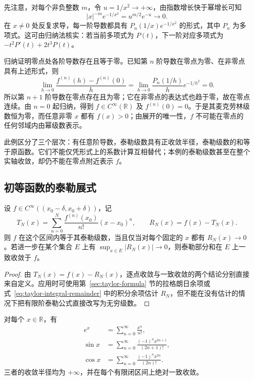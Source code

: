 \begin{solve}
先注意，对每个非负整数 $m$，令 $u=1/x^2\to+\infty$，由指数增长快于幂增长可知
\[
    |x|^{-m}e^{-1/x^2}=u^{m/2}e^{-u}\longrightarrow0.
\]
在 $x\neq0$ 处反复求导，每一阶导数都具有 $P_n(1/x)e^{-1/x^2}$ 的形式，其中 $P_n$ 为多项式。这可由归纳法核实：若当前多项式为 $P(t)$，下一阶对应多项式为 $-t^2P'(t)+2t^3P(t)$。

归纳证明零点处各阶导数存在且等于零。已知第 $n$ 阶导数在零点为零、在非零点具有上述形式，则
\[
    \lim_{h\to0}\frac{f^{(n)}(h)-f^{(n)}(0)}h
       =\lim_{h\to0}\frac{P_n(1/h)}h e^{-1/h^2}=0.
\]
所以第 $n+1$ 阶导数在零点存在且为零；它在非零点的表达式也趋于零，故在零点连续。由 $n=0$ 起归纳，得到 $f\in C^\infty(\mathbb R)$ 及 $f^{(n)}(0)=0$。于是其麦克劳林级数恒为零，而任意非零 $x$ 都有 $f(x)>0$；由展开的唯一性，$f$ 不可能在零点的任何邻域内由幂级数表示。
\end{solve}

此例区分了三个层次：有任意阶导数，泰勒级数具有正收敛半径，泰勒级数的和等于原函数。它们不能仅凭形式上的系数计算互相替代；本例的泰勒级数甚至在整个实轴收敛，却仍不能在零点附近表示 $f$。

\subsection{初等函数的泰勒展式}
\label{subsec:taylor-expansions-of-elementary-functions}

\begin{theorem}[泰勒展开的余项判据]
\label{thm:taylor-expansion-remainder-criterion}
设 $f\in C^\infty((x_0-\delta,x_0+\delta))$，记
\[
    T_N(x)=\sum_{n=0}^N\frac{f^{(n)}(x_0)}{n!}(x-x_0)^n,
    \qquad R_N(x)=f(x)-T_N(x).
\]
则 $f$ 在这个区间内等于其泰勒级数，当且仅当对每个固定的 $x$ 都有 $R_N(x)\to0$。若进一步在某个集合 $E$ 上有 $\sup_{x\in E}|R_N(x)|\to0$，则泰勒部分和在 $E$ 上一致收敛于 $f$。
\end{theorem}

\begin{proof}
由 $T_N(x)=f(x)-R_N(x)$，逐点收敛与一致收敛的两个结论分别直接来自定义。应用时可使用第~\ref{sec:taylor-formula} 节的拉格朗日余项或式~\eqref{eq:taylor-integral-remainder} 中的积分余项估计 $R_N$，但不能在没有估计的情况下把有限阶泰勒公式直接改写为无穷级数。
\end{proof}

\begin{proposition}[指数、正弦与余弦的展开]
\label{prop:exponential-sine-cosine-power-expansions}
对每个 $x\in\mathbb R$，有
\begin{align}
    e^x&=\sum_{n=0}^\infty\frac{x^n}{n!},
        \label{eq:exponential-maclaurin-expansion}\\
    \sin x&=\sum_{n=0}^\infty
        \frac{(-1)^nx^{2n+1}}{(2n+1)!},
        \label{eq:sine-maclaurin-expansion}\\
    \cos x&=\sum_{n=0}^\infty
        \frac{(-1)^nx^{2n}}{(2n)!}.
        \label{eq:cosine-maclaurin-expansion}
\end{align}
三者的收敛半径均为 $+\infty$，并在每个有限闭区间上绝对一致收敛。
\end{proposition}

